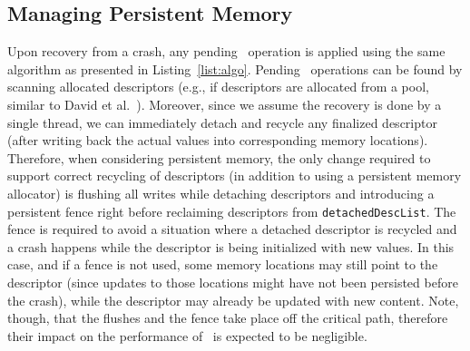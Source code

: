 {\subsection{Managing Persistent Memory}
Upon recovery from a crash, any pending \pmcas\ operation is applied using the same algorithm as presented in Listing~\ref{list:algo}.
Pending \pmcas\ operations can be found by scanning allocated descriptors (e.g., if descriptors are allocated from a pool, similar to David et al.~\cite{david18}).
Moreover, since we assume the recovery is done by a single thread, we can immediately 
detach and recycle any finalized descriptor (after writing back the actual values into corresponding memory locations).
Therefore, when considering persistent memory, 
the only change required to support correct recycling of descriptors (in addition to using a persistent memory allocator) is
flushing all writes while detaching descriptors and introducing a persistent fence 
right before reclaiming descriptors from \texttt{detachedDescList}.
The fence is required to avoid a situation where a detached descriptor is recycled and a crash happens while 
the descriptor is being initialized with new values.
In this case, and if a fence is not used, 
some memory locations may still point to the descriptor (since updates to those locations might have not been persisted before the crash), 
while the descriptor may already be updated with new content.
Note, though, that the flushes and the fence take place off the critical path, 
therefore their impact on the performance of \pmcas\ is expected to be negligible.
}